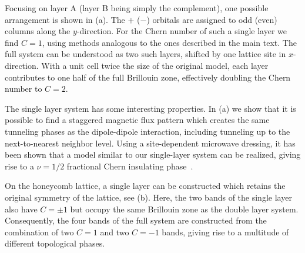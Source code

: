 Focusing on layer A (layer B being simply the complement), one possible arrangement is shown in (a).
The ${+}$ (${-}$) orbitals are assigned to odd (even) columns along the $y$-direction.
For the Chern number of such a single layer we find $C=1$, using methods analogous to the ones described in the main text.
The full system can be understood as two such layers, shifted by one lattice site in $x$-direction.
With a unit cell twice the size of the original model, each layer contributes to one half of the full Brillouin zone, effectively doubling the Chern number to $C=2$.

The single layer system has some interesting properties.
In (a) we show that it is possible to find a staggered magnetic flux pattern which creates the same tunneling phases as the dipole-dipole interaction, including tunneling up to the next-to-nearest neighbor level.
Using a site-dependent microwave dressing, it has been shown that a model similar to our single-layer system can be realized, giving rise to a $\nu=1/2$ fractional Chern insulating phase~\cite{Yao2012,Yao2013}.

On the honeycomb lattice, a single layer can be constructed which retains the original symmetry of the lattice, see (b). Here, the two bands of the single layer also have $C=\pm 1$ but occupy the same Brillouin zone as the double layer system. Consequently, the four bands of the full system are constructed from the combination of two $C=1$ and two $C=-1$ bands, giving rise to a multitude of different topological phases.
